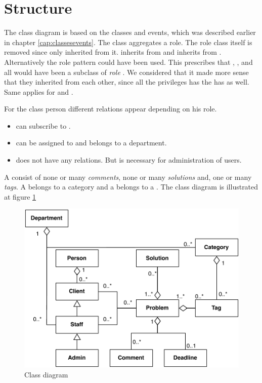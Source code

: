 \section{Structure}
\label{sec:problem_structure}
The class diagram is based on the classes and events, which was described earlier in chapter \ref{cap:classesevents}. The class  aggregates a role. The role class itself is removed since only \class{\client[]} inherited from it. \class{\staff[]} inherits from \class{\client[]} and \class{\admin[]} inherits from \cl{\client[]}. Alternatively the role pattern could have been used. This prescribes that \class{\admin[]}, \class{\client[]}, and \class{\staff[]} all would have been a subclass of \textit{role}  \cite[p. 80]{roedeaalborg}. We considered that it made more sense that they inherited from each other, since all the privileges \class{\staff[]} has the \class{\admin[]} has as well. Same applies for \class{\staff[]} and \cl{\client[]}.  

For the class person different relations appear depending on his role. 
\begin{itemize}
\item {} can subscribe to .
\item \class{\staff[]} can be assigned to  and \class{\staff[]} belongs to a department. 
\item \class{\admin[]} does not have any relations. But is necessary for administration of users.  
\end{itemize}

A \problem[] consist of none or many \textit{comments}, none or many \textit{solutions} and, one or many \textit{tags}. A  belongs to a category and a  belongs to a .  The class diagram is illustrated at figure \ref{fig:pdaclassdiagram}

\begin{figure}
\begin{center}
\includegraphics[scale=0.6]{input/problem_domain_analysis/newest_class_diagram.pdf}
\caption{Class diagram}
\label{fig:pdaclassdiagram}
\end{center}
\end{figure}